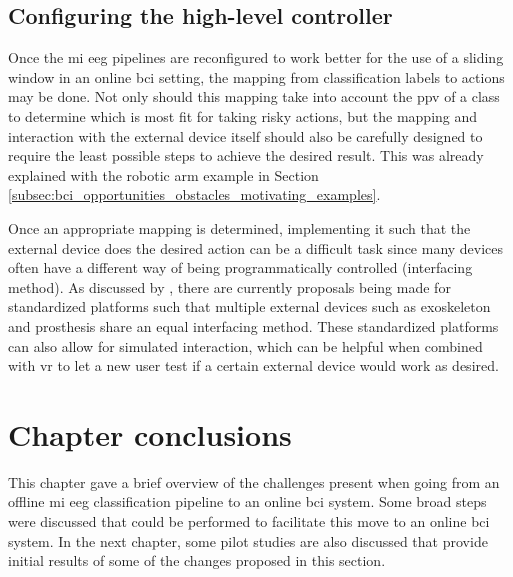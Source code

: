 
\subsection{Configuring the high-level controller}
\label{subsec:online_bci_system_different_common_steps_mapping} 

Once the \gls{mi} \gls{eeg} pipelines are reconfigured to work better for the use of a sliding window in an online \gls{bci} setting, the mapping from classification labels to actions may be done.
Not only should this mapping take into account the \gls{ppv} of a class to determine which is most fit for taking risky actions, but the mapping and interaction with the external device itself should also be carefully designed to require the least possible steps to achieve the desired result.
This was already explained with the robotic arm example in Section \ref{subsec:bci_opportunities_obstacles_motivating_examples}.

Once an appropriate mapping is determined, implementing it such that the external device does the desired action can be a difficult task since many devices often have a different way of being programmatically controlled (interfacing method).
As discussed by \citet{bci_review_arnau}, there are currently proposals being made for standardized platforms such that multiple external devices such as exoskeleton and prosthesis share an equal interfacing method.
These standardized platforms can also allow for simulated interaction, which can be helpful when combined with \gls{vr} to let a new user test if a certain external device would work as desired. 

\section{Chapter conclusions}
\label{sec:online_bci_system_other_changes_conclusion}

This chapter gave a brief overview of the challenges present when going from an offline \gls{mi} \gls{eeg} classification pipeline to an online \gls{bci} system.
Some broad steps were discussed that could be performed to facilitate this move to an online \gls{bci} system.
In the next chapter, some pilot studies are also discussed that provide initial results of some of the changes proposed in this section.
